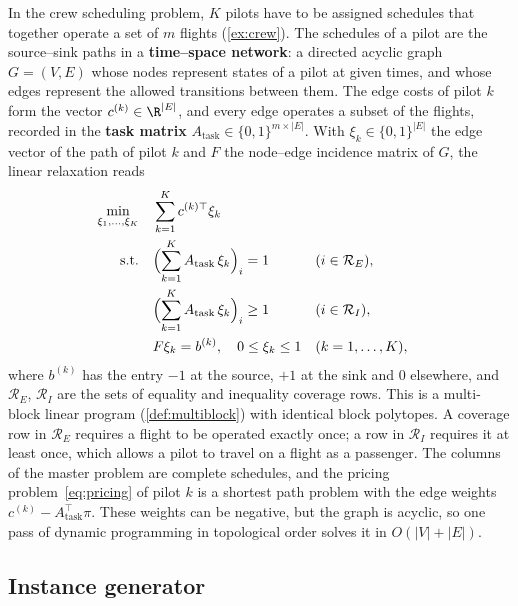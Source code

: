 In the crew scheduling problem, $K$ pilots have to be assigned schedules that together
operate a set of $m$ flights (\cref{ex:crew}). The schedules of a pilot are the source--sink
paths in a \textbf{time--space network}: a directed acyclic graph $G = (V,E)$ whose nodes
represent states of a pilot at given times, and whose edges represent the allowed transitions
between them. The edge costs of pilot $k$ form the vector $c^{(k)}\in\R^{|E|}$, and every edge
operates a subset of the flights, recorded in the \textbf{task matrix}
$A_{\mathrm{task}}\in\{0,1\}^{m\times|E|}$. With $\xi_k\in\{0,1\}^{|E|}$ the edge vector of the
path of pilot $k$ and $F$ the node--edge incidence matrix of $G$, the linear relaxation reads
\begin{subequations} \label{eq:crew}
\begin{align}
\min_{\xi_1,\dots,\xi_K}\quad & \sum_{k=1}^{K} c^{(k)\top} \xi_k\\
\text{s.t.}\quad & \Bigl(\sum_{k=1}^{K}A_{\mathrm{task}}\,\xi_k\Bigr)_i = 1 && (i\in\mathcal{R}_E),
\label{eq:crew-eq}\\
& \Bigl(\sum_{k=1}^{K}A_{\mathrm{task}}\,\xi_k\Bigr)_i \ge 1 && (i\in\mathcal{R}_I),
\label{eq:crew-ineq}\\
& F \xi_k = b^{(k)},\quad 0\le \xi_k\le 1 && (k = 1,\dots,K),
\end{align}
\end{subequations}
where $b^{(k)}$ has the entry $-1$ at the source, $+1$ at the sink and $0$ elsewhere, and
$\mathcal{R}_E$, $\mathcal{R}_I$ are the sets of equality and inequality coverage rows. This is a
multi-block linear program (\cref{def:multiblock}) with identical block polytopes. A
coverage row in $\mathcal{R}_E$ requires a flight to be operated exactly once; a row in
$\mathcal{R}_I$ requires it at least once, which allows a pilot to travel on a flight as a
passenger. The columns of the master problem are complete schedules, and the pricing
problem~\eqref{eq:pricing} of pilot $k$ is a shortest path problem with the edge weights
$c^{(k)} - A_{\mathrm{task}}^\top\pi$. These weights can be negative, but the graph is
acyclic, so one pass of dynamic programming in topological order solves it in
$O(|V|+|E|)$.

\subsection{Instance generator}

